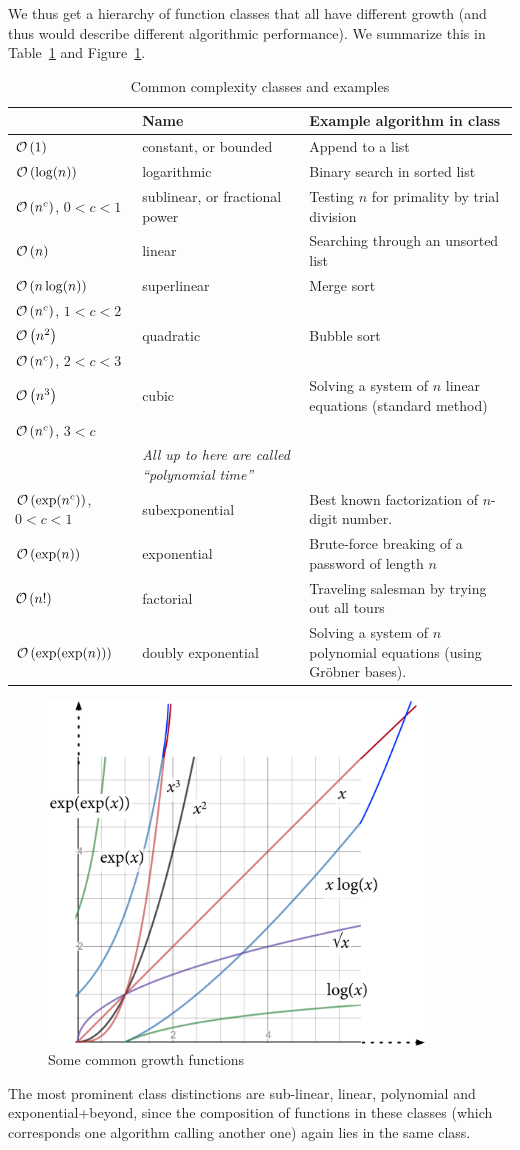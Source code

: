 We thus get a hierarchy of function classes that all have different growth
(and thus would describe different algorithmic performance).
We summarize this in Table~\ref{tabcomplcla} and Figure~\ref{figcomcl}.
\begin{table}
\begin{tabular}{p{24mm}|p{30mm}|p{40mm}}
&Name&Example algorithm in class\\
\hline
${\mathcal O}\/\left(1\right)$&constant, or bounded&Append to a list\\
${\mathcal O}\/\left(\log(n)\right)$&logarithmic&Binary search in sorted list\\
${\mathcal O}\/\left(n^c\right)$, $0<c<1$&sublinear, or fractional power&Testing $n$ for primality by trial division\\
${\mathcal O}\/\left(n\right)$&linear&Searching through an unsorted list\\
${\mathcal O}\/\left(n\log(n)\right)$&superlinear&Merge sort\\
${\mathcal O}\/\left(n^c\right)$, $1<c<2$&&\\
${\mathcal O}\/\left(n^2\right)$&quadratic&Bubble sort\\
${\mathcal O}\/\left(n^c\right)$, $2<c<3$&&\\
${\mathcal O}\/\left(n^3\right)$&cubic&Solving a system of $n$ linear equations (standard
method)\\
${\mathcal O}\/\left(n^c\right)$, $3<c$&&\\
&{\em All up to here are called ``polynomial time''}&\\
${\mathcal O}\/\left(\exp(n^c)\right)$, $0<c<1$&subexponential&Best known factorization of
$n$-digit number.\\
${\mathcal O}\/\left(\exp(n)\right)$&exponential&Brute-force breaking of a password of length $n$\\
${\mathcal O}\/\left(n!\right)$&factorial&Traveling salesman by trying out all tours\\
${\mathcal O}\/\left(\exp(\exp(n))\right)$&doubly exponential&Solving a system of $n$ polynomial equations (using Gr\"obner bases).
\end{tabular}
\caption{Common complexity classes and examples}
\label{tabcomplcla}
\end{table}
\begin{figure}
\begin{center}
\includegraphics[width=10cm]{pic/GrowthOrders.pdf}
\end{center}
\caption{Some common growth functions}
\label{figcomcl}
\end{figure}
The most prominent class distinctions are sub-linear, linear, polynomial and
exponential+beyond, since the composition of functions in these classes
(which corresponds one algorithm calling another one)
again lies in the same class.

